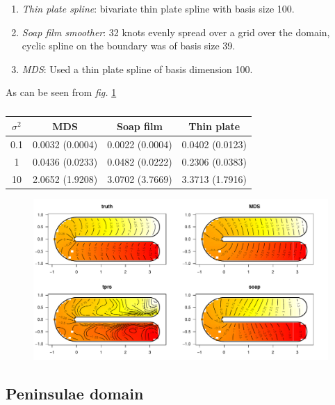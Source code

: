 \documentclass[a4paper,10pt]{article}
\newcommand{\fig}[1]{\emph{fig.} \ref{#1}}
\begin{document}
\begin{enumerate}
\item \emph{Thin plate spline}: bivariate thin plate spline with basis size 100.
\item \emph{Soap film smoother}: 32 knots evenly spread over a grid over the domain, cyclic spline on the boundary was of basis size 39.
\item \emph{MDS}: Used a thin plate spline of basis dimension 100.
\end{enumerate} 

As can be seen from \fig{ramsay-fit-1}

\begin{table}[ht]
\centering
\begin{tabular}{c || c c c}
$\sigma^2$ & MDS & Soap film & Thin plate\\ 
\hline
0.1  & 0.0032 (0.0004) & 0.0022 (0.0004) & 0.0402 (0.0123)\\ 
1  & 0.0436 (0.0233) & 0.0482 (0.0222) & 0.2306 (0.0383)\\ 
10  & 2.0652 (1.9208) & 3.0702 (3.7669) & 3.3713 (1.7916)\\ 
\end{tabular}
\label{ramsayresultstable}
\caption{}
\end{table}

\begin{figure}
\centering
\includegraphics[width=6in]{figs/ramsay-fit-1.pdf} \\
\caption{}
\label{ramsay-fit-1}
\end{figure}

\subsection{Peninsulae domain}
\end{document}

